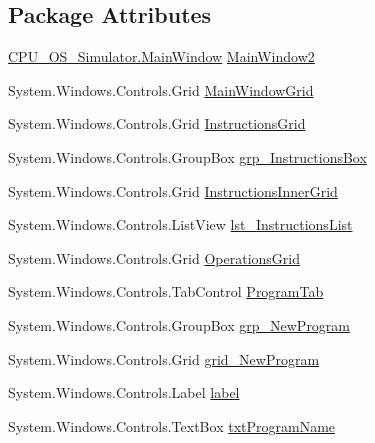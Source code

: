 \subsection*{Package Attributes}
\begin{DoxyCompactItemize}
\item 
\hyperlink{class_c_p_u___o_s___simulator_1_1_main_window}{C\+P\+U\+\_\+\+O\+S\+\_\+\+Simulator.\+Main\+Window} \hyperlink{class_c_p_u___o_s___simulator_1_1_main_window_adf996cda04d3cf426847b8fd8981ee66}{Main\+Window2}
\item 
System.\+Windows.\+Controls.\+Grid \hyperlink{class_c_p_u___o_s___simulator_1_1_main_window_a5c56d82a7b611446e81b7baa3229d76b}{Main\+Window\+Grid}
\item 
System.\+Windows.\+Controls.\+Grid \hyperlink{class_c_p_u___o_s___simulator_1_1_main_window_a2e6841673af413e8a8f8ba8aa0d7c80b}{Instructions\+Grid}
\item 
System.\+Windows.\+Controls.\+Group\+Box \hyperlink{class_c_p_u___o_s___simulator_1_1_main_window_aebc1256b654d001b7c4ce2bc08522667}{grp\+\_\+\+Instructions\+Box}
\item 
System.\+Windows.\+Controls.\+Grid \hyperlink{class_c_p_u___o_s___simulator_1_1_main_window_a94a99eeb7f5fcfcfbdc375937d5439e7}{Instructions\+Inner\+Grid}
\item 
System.\+Windows.\+Controls.\+List\+View \hyperlink{class_c_p_u___o_s___simulator_1_1_main_window_acdab094f589df9435fa8e3bfe04e61cb}{lst\+\_\+\+Instructions\+List}
\item 
System.\+Windows.\+Controls.\+Grid \hyperlink{class_c_p_u___o_s___simulator_1_1_main_window_ae4f2459995eb2f672c0fd3c2248b79fd}{Operations\+Grid}
\item 
System.\+Windows.\+Controls.\+Tab\+Control \hyperlink{class_c_p_u___o_s___simulator_1_1_main_window_a615ea960969aa9a61afdaef8cf039348}{Program\+Tab}
\item 
System.\+Windows.\+Controls.\+Group\+Box \hyperlink{class_c_p_u___o_s___simulator_1_1_main_window_a1e75e7af485b229372a6aafb84c2ffe0}{grp\+\_\+\+New\+Program}
\item 
System.\+Windows.\+Controls.\+Grid \hyperlink{class_c_p_u___o_s___simulator_1_1_main_window_a38bef5fa03edcca52fa7fc11068923bd}{grid\+\_\+\+New\+Program}
\item 
System.\+Windows.\+Controls.\+Label \hyperlink{class_c_p_u___o_s___simulator_1_1_main_window_ad60038602dcf5d954e420bee89c8494d}{label}
\item 
System.\+Windows.\+Controls.\+Text\+Box \hyperlink{class_c_p_u___o_s___simulator_1_1_main_window_a2c64b45db8c1d7a30c2f9155899cf918}{txt\+Program\+Name}

\end{DoxyCompactItemize}
